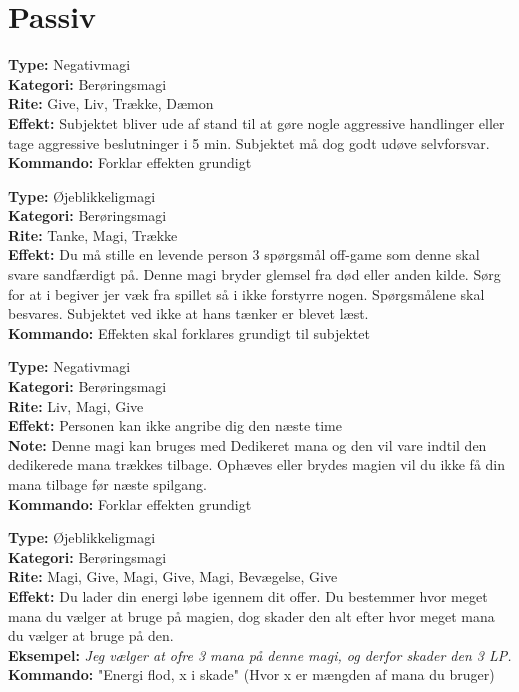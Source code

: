 \section{Passiv}
\begin{passiv*}
\textbf{Type:} Negativmagi\\
\textbf{Kategori:} Berøringsmagi\\
\textbf{Rite:} Give, Liv, Trække, Dæmon\\
\textbf{Effekt:} Subjektet bliver ude af stand til at gøre nogle aggressive handlinger eller tage aggressive beslutninger i 5 min. Subjektet må dog godt udøve selvforsvar.\\
\textbf{Kommando:} Forklar effekten grundigt
\end{passiv*}

\begin{passiv*}
\textbf{Type:} Øjeblikkeligmagi\\
\textbf{Kategori:} Berøringsmagi\\
\textbf{Rite:} Tanke, Magi, Trække\\
\textbf{Effekt:} Du må stille en levende person 3 spørgsmål off-game som denne skal svare sandfærdigt på. Denne magi bryder glemsel fra død eller anden kilde. Sørg for at i begiver jer væk fra spillet så i ikke forstyrre nogen. Spørgsmålene skal besvares. Subjektet ved ikke at hans tænker er blevet læst.\\
\textbf{Kommando:} Effekten skal forklares grundigt til subjektet
\end{passiv*}

\begin{passiv*}[Fred]
\textbf{Type:} Negativmagi\\
\textbf{Kategori:} Berøringsmagi\\
\textbf{Rite:} Liv, Magi, Give\\
\textbf{Effekt:} Personen kan ikke angribe dig den næste time\\
\textbf{Note:} Denne magi kan bruges med Dedikeret mana og den vil vare indtil den dedikerede mana trækkes tilbage. Ophæves eller brydes magien vil du ikke få din mana tilbage før næste spilgang.\\
\textbf{Kommando:} Forklar effekten grundigt
\end{passiv*}

\begin{passiv*}
\textbf{Type:} Øjeblikkeligmagi\\
\textbf{Kategori:} Berøringsmagi\\
\textbf{Rite:} Magi, Give, Magi, Give, Magi, Bevægelse, Give\\
\textbf{Effekt:} Du lader din energi løbe igennem dit offer. Du bestemmer hvor meget mana du vælger at bruge på magien, dog skader den alt efter hvor meget mana du vælger at bruge på den.\\
\textbf{Eksempel:} \textit{ Jeg vælger at ofre 3 mana på denne magi, og derfor skader den 3 LP.}\\
\textbf{Kommando:} "Energi flod, x i skade" (Hvor x er mængden af mana du bruger)\\
\end{passiv*}


